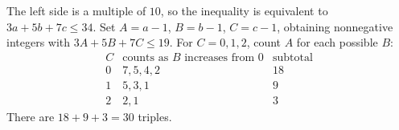 The left side is a multiple of $10$, so the inequality is equivalent to $3a+5b+7c\le34$. Set $A=a-1$, $B=b-1$, $C=c-1$, obtaining nonnegative integers with $3A+5B+7C\le19$. For $C=0,1,2$, count $A$ for each possible $B$:
\[
\begin{array}{c|c|c}
C&\text{counts as }B\text{ increases from }0&\text{subtotal}\\\hline
0&7,5,4,2&18\\
1&5,3,1&9\\
2&2,1&3
\end{array}
\]
There are $\boxed{18+9+3=30}$ triples.
